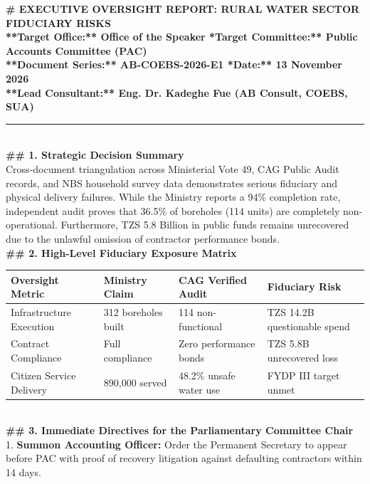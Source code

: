 \documentclass[11pt, a4paper]{report}
\begin{document}
\begin{tcolorbox}[colback=lightgrey, colframe=bordergrey, title=\textbf{Deliverable 5A Preview: \texttt{Report1\_Executive\_Water\_Oversight.md}}]
\small
\textbf{\# EXECUTIVE OVERSIGHT REPORT: RURAL WATER SECTOR FIDUCIARY RISKS}\\
\textbf{**Target Office:** Office of the Speaker \quad \textbar{} \quad **Target Committee:** Public Accounts Committee (PAC)}\\
\textbf{**Document Series:** AB-COEBS-2026-E1 \quad \textbar{} \quad **Date:** 13 November 2026}\\
\textbf{**Lead Consultant:** Eng. Dr. Kadeghe Fue (AB Consult, COEBS, SUA)}\\[0.2cm]
\rule{\textwidth}{0.4pt}\\[0.2cm]
\textbf{\#\# 1. Strategic Decision Summary}\\
Cross-document triangulation across Ministerial Vote 49, CAG Public Audit records, and NBS household survey data demonstrates serious fiduciary and physical delivery failures. While the Ministry reports a 94\% completion rate, independent audit proves that 36.5\% of boreholes (114 units) are completely non-operational. Furthermore, TZS 5.8 Billion in public funds remains unrecovered due to the unlawful omission of contractor performance bonds.\\[0.2cm]
\textbf{\#\# 2. High-Level Fiduciary Exposure Matrix}\\
\begin{tabular}{p{3.2cm}p{2.8cm}p{3.2cm}p{3.6cm}}
\toprule
\textbf{Oversight Metric} & \textbf{Ministry Claim} & \textbf{CAG Verified Audit} & \textbf{Fiduciary Risk} \\
\midrule
Infrastructure Execution & 312 boreholes built & 114 non-functional & TZS 14.2B questionable spend \\
Contract Compliance & Full compliance & Zero performance bonds & TZS 5.8B unrecovered loss \\
Citizen Service Delivery & 890,000 served & 48.2\% unsafe water use & FYDP III target unmet \\
\bottomrule
\end{tabular}\\[0.2cm]
\textbf{\#\# 3. Immediate Directives for the Parliamentary Committee Chair}\\
1. \textbf{Summon Accounting Officer:} Order the Permanent Secretary to appear before PAC with proof of recovery litigation against defaulting contractors within 14 days.\\

\end{tcolorbox}
\end{document}
